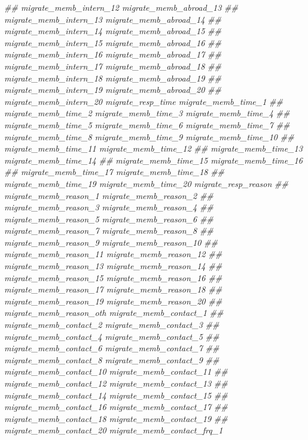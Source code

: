 \documentclass[
]{article}
\newenvironment{Shaded}{\begin{snugshade}}{\end{snugshade}}
\newcommand{\CommentTok}[1]{\textcolor[rgb]{0.56,0.35,0.01}{\textit{#1}}}
\begin{document}
\begin{Shaded}
\begin{Highlighting}[]
\CommentTok{##      migrate_memb_intern_12 migrate_memb_abroad_13}
\CommentTok{##      migrate_memb_intern_13 migrate_memb_abroad_14}
\CommentTok{##      migrate_memb_intern_14 migrate_memb_abroad_15}
\CommentTok{##      migrate_memb_intern_15 migrate_memb_abroad_16}
\CommentTok{##      migrate_memb_intern_16 migrate_memb_abroad_17}
\CommentTok{##      migrate_memb_intern_17 migrate_memb_abroad_18}
\CommentTok{##      migrate_memb_intern_18 migrate_memb_abroad_19}
\CommentTok{##      migrate_memb_intern_19 migrate_memb_abroad_20}
\CommentTok{##      migrate_memb_intern_20 migrate_resp_time migrate_memb_time_1}
\CommentTok{##      migrate_memb_time_2 migrate_memb_time_3 migrate_memb_time_4}
\CommentTok{##      migrate_memb_time_5 migrate_memb_time_6 migrate_memb_time_7}
\CommentTok{##      migrate_memb_time_8 migrate_memb_time_9 migrate_memb_time_10}
\CommentTok{##      migrate_memb_time_11 migrate_memb_time_12}
\CommentTok{##      migrate_memb_time_13 migrate_memb_time_14}
\CommentTok{##      migrate_memb_time_15 migrate_memb_time_16}
\CommentTok{##      migrate_memb_time_17 migrate_memb_time_18}
\CommentTok{##      migrate_memb_time_19 migrate_memb_time_20 migrate_resp_reason}
\CommentTok{##      migrate_memb_reason_1 migrate_memb_reason_2}
\CommentTok{##      migrate_memb_reason_3 migrate_memb_reason_4}
\CommentTok{##      migrate_memb_reason_5 migrate_memb_reason_6}
\CommentTok{##      migrate_memb_reason_7 migrate_memb_reason_8}
\CommentTok{##      migrate_memb_reason_9 migrate_memb_reason_10}
\CommentTok{##      migrate_memb_reason_11 migrate_memb_reason_12}
\CommentTok{##      migrate_memb_reason_13 migrate_memb_reason_14}
\CommentTok{##      migrate_memb_reason_15 migrate_memb_reason_16}
\CommentTok{##      migrate_memb_reason_17 migrate_memb_reason_18}
\CommentTok{##      migrate_memb_reason_19 migrate_memb_reason_20}
\CommentTok{##      migrate_memb_reason_oth migrate_memb_contact_1}
\CommentTok{##      migrate_memb_contact_2 migrate_memb_contact_3}
\CommentTok{##      migrate_memb_contact_4 migrate_memb_contact_5}
\CommentTok{##      migrate_memb_contact_6 migrate_memb_contact_7}
\CommentTok{##      migrate_memb_contact_8 migrate_memb_contact_9}
\CommentTok{##      migrate_memb_contact_10 migrate_memb_contact_11}
\CommentTok{##      migrate_memb_contact_12 migrate_memb_contact_13}
\CommentTok{##      migrate_memb_contact_14 migrate_memb_contact_15}
\CommentTok{##      migrate_memb_contact_16 migrate_memb_contact_17}
\CommentTok{##      migrate_memb_contact_18 migrate_memb_contact_19}
\CommentTok{##      migrate_memb_contact_20 migrate_memb_contact_frq_1}

\end{Highlighting}
\end{Shaded}
\end{document}
